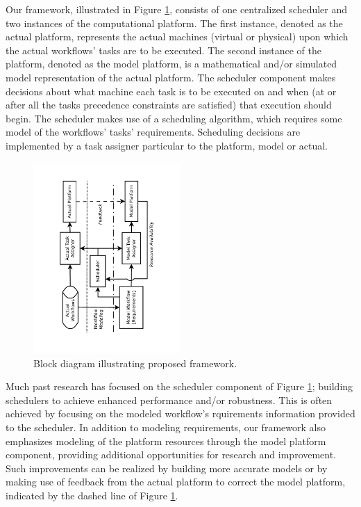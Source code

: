 \documentclass[10pt]{csce}
\begin{document}
Our framework, illustrated in Figure \ref{fig:platform}, consists of one
centralized scheduler and two instances of the computational platform.  The
first instance, denoted as the actual platform, represents the actual machines
(virtual or physical) upon which the actual workflows' tasks are to be executed.
The second instance of the platform, denoted as the model platform, is a
mathematical and/or simulated model representation of the actual platform.  The
scheduler component makes decisions about what machine each task is to be
executed on and when (at or after all the tasks precedence constraints are
satisfied) that execution should begin.  The scheduler makes use of a scheduling
algorithm, which requires some model of the workflows' tasks' requirements.
Scheduling decisions are implemented by a task assigner particular to the
platform, model or actual.

\begin{figure}
	\begin{center}
		\includegraphics[angle=-90,width=0.5\textwidth]{figures/PlatformDiagram.pdf}
	\end{center}
	\caption{Block diagram illustrating proposed framework.}
	\label{fig:platform}
\end{figure}

Much past research has focused on the scheduler component of Figure
\ref{fig:platform}; building schedulers to achieve enhanced performance and/or
robustness.  This is often achieved by focusing on the modeled workflow's
rquirements information provided to the scheduler.  In addition to modeling
requirements, our framework also emphasizes modeling of the platform resources
through the model platform component, providing additional opportunities for
research and improvement.  Such improvements can be realized by building more
accurate models or by making use of feedback from the actual platform to correct
the model platform, indicated by the dashed line of Figure \ref{fig:platform}.
\end{document}
